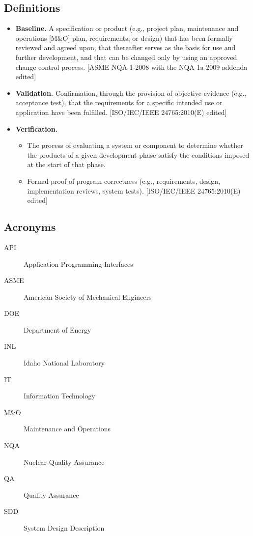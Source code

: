 \subsection{Definitions}
\begin{itemize}
  \item \textbf{Baseline.} A specification or product (e.g., project plan, maintenance and operations [M\&O] plan, requirements, or 
design) that has been formally reviewed and agreed upon, that thereafter serves as the basis for use and further 
development, and that can be changed only by using an approved change control process. [ASME NQA-1-2008 with the 
NQA-1a-2009 addenda edited]
  \item \textbf{Validation.} Confirmation, through the provision of objective evidence (e.g., acceptance test), that the requirements 
for a specific intended use or application have been fulfilled. [ISO/IEC/IEEE 24765:2010(E) edited]
  \item \textbf{Verification.}
  \begin{itemize}
     \item The process of evaluating a system or component to determine whether the products of a given development 
     phase satisfy the conditions imposed at the start of that phase.
     \item  Formal proof of program correctness (e.g., requirements, design, implementation reviews, system tests). 
     [ISO/IEC/IEEE 24765:2010(E) edited]
  \end{itemize}
\end{itemize}

\subsection{Acronyms}
\begin{description}
\item[API] Application Programming Interfaces
\item[ASME] American Society of Mechanical Engineers
\item[DOE] Department of Energy
\item[INL] Idaho National Laboratory
\item[IT] Information Technology
\item[M\&O] Maintenance and Operations
\item[NQA] Nuclear Quality Assurance
\item[QA] Quality Assurance
\item[SDD] System Design Description
\end{description}